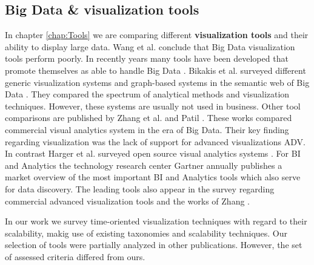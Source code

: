 \subsection{Big Data \& visualization tools}
In chapter \ref{chap:Tools} we are comparing different \textbf{visualization tools}  and their ability to display large data. Wang et al. conclude that Big Data visualization tools perform poorly\cite{Wang2015}. In recently years many tools have been developed that promote themselves as able to handle Big Data \cite{Zoomdata2017, Datameer2017, Zeppelin2017}. Bikakis et al. surveyed different generic visualization systems and graph-based systems in the semantic web of Big Data \cite{Bikakis2016}. They compared the spectrum of analytical methods and visualization techniques. However, these systems are usually not used in business. 
Other tool comparisons are published by Zhang et al.  \cite{Zhang2012} and Patil  \cite{Patil}. These works compared commercial visual analytics system in the era of Big Data. Their key finding regarding visualization was the lack of support for advanced visualizations \gls{ADV}. In contrast Harger et al. surveyed open source visual analytics systems  \cite{Harger2012}. For \gls{BI} and Analytics the technology research center Gartner annually publishes a market overview of the most important \gls{BI} and Analytics tools which also serve for data discovery. The leading tools also appear in the survey  \cite{Evelson2012} regarding commercial advanced visualization tools and the works of Zhang  \cite{Zhang2012}. 
\par
In our work we survey time-oriented visualization techniques with regard to their scalability, makig use of existing taxonomies and scalability techniques. Our selection of tools were partially analyzed in other publications. However, the set of assessed criteria differed from ours.






